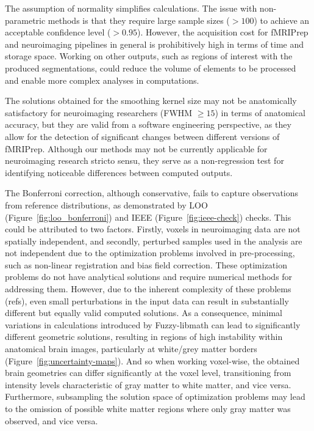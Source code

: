 \documentclass{article}
\newcommand{\fmriprep}{fMRIPrep\xspace}
\begin{document}
The assumption of normality simplifies calculations. The issue with non-parametric methods is that they require large sample sizes ($>100$) to achieve an acceptable confidence level ($>0.95$). However, the acquisition cost for \fmriprep and neuroimaging pipelines in general is prohibitively high in terms of time and storage space. Working on other outputs, such as regions of interest with the produced segmentations, could reduce the volume of elements to be processed and enable more complex analyses in computations.

The solutions obtained for the smoothing kernel size may not be anatomically satisfactory for neuroimaging researchers (FWHM $\geq 15$) in terms of anatomical accuracy, but they are valid from a software engineering perspective, as they allow for the detection of significant changes between different versions of \fmriprep. Although our methods may not be currently applicable for neuroimaging research stricto sensu, they serve as a non-regression test for identifying noticeable differences between computed outputs.

The Bonferroni correction, although conservative, fails to capture observations from reference distributions, as demonstrated by LOO (Figure~\ref{fig:loo_bonferroni}) and IEEE (Figure~\ref{fig:ieee-check}) checks. This could be attributed to two factors. Firstly, voxels in neuroimaging data are not spatially independent, and secondly, perturbed samples used in the analysis are not independent due to the optimization problems involved in pre-processing, such as non-linear registration and bias field correction. These optimization problems do not have analytical solutions and require numerical methods for addressing them. However, due to the inherent complexity of these problems (refs), even small perturbations in the input data can result in substantially different but equally valid computed solutions. As a consequence, minimal variations in calculations introduced by Fuzzy-libmath can lead to significantly different geometric solutions, resulting in regions of high instability within anatomical brain images, particularly at white/grey matter borders (Figure~\ref{fig:uncertainty-maps}). And so when working voxel-wise, the obtained brain geometries can differ significantly at the voxel level, transitioning from intensity levels characteristic of gray matter to white matter, and vice versa. Furthermore, subsampling the solution space of optimization problems may lead to the omission of possible white matter regions where only gray matter was observed, and vice versa.
\end{document}
